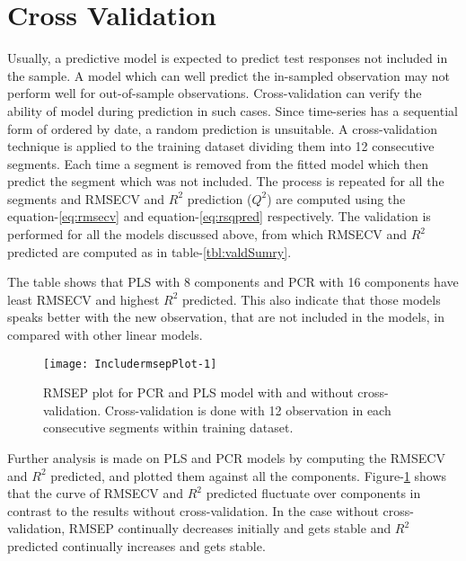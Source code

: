 \documentclass[12pt, lot, lof]{thesis}\usepackage[]{graphicx}\usepackage[]{color}
\makeatletter
\def\maxwidth{ %
  \ifdim\Gin@nat@width>\linewidth
    \linewidth
  \else
    \Gin@nat@width
  \fi
}
\makeatother
\begin{document}

\section{Cross Validation}
\label{sec:crossvalidation}




Usually, a predictive model is expected to predict test responses not included in the sample. A model which can well predict the in-sampled observation may not perform well for out-of-sample observations. Cross-validation can verify the ability of model during prediction in such cases. Since time-series has a sequential form of ordered by date, a random prediction is unsuitable. A cross-validation technique is applied to the training dataset dividing them into 12 consecutive segments. Each time a segment is removed from the fitted model which then predict the segment which was not included. The process is repeated for all the segments and RMSECV and $R^2$ prediction ($Q^2$) are computed using the equation-\ref{eq:rmsecv} and equation-\ref{eq:rsqpred} respectively. The validation is performed for all the models discussed above, from which RMSECV and $R^2$ predicted are computed as in table-\ref{tbl:valdSumry}.

The table shows that PLS with 8 components and PCR with 16 components have least RMSECV and highest $R^2$ predicted. This also indicate that those models speaks better with the new observation, that are not included in the models, in compared with other linear models.

\begin{Schunk}
\begin{figure}[htpb]

{\centering \texttt{[image: IncludermsepPlot-1]} 

}

\caption[RMSEP plot for PCR and PLS]{RMSEP plot for PCR and PLS model with and without cross-validation. Cross-validation is done with 12 observation in each consecutive segments within training dataset.\label{fig:rmsepPlot}}
\end{figure}
\end{Schunk}

Further analysis is made on PLS and PCR models by computing the RMSECV and $R^2$ predicted, and plotted them against all the components. Figure-\ref{fig:rmsepPlot} shows that the curve of RMSECV and $R^2$ predicted fluctuate over components in contrast to the results without cross-validation. In the case without cross-validation, RMSEP continually decreases initially and gets stable and $R^2$ predicted continually increases and gets stable. 
\end{document}
